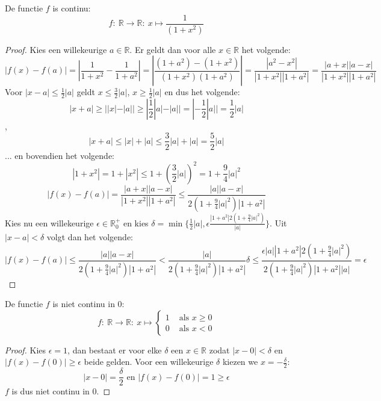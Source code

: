 \documentclass[main.tex]{subfiles}
\begin{document}
\begin{vb}
  De functie $f$ is continu:
  \[ f:\ \mathbb{R} \rightarrow \mathbb{R}:\ x \mapsto \frac{1}{(1+x^{2})} \]

  \begin{proof}
    Kies een willekeurige $a\in \mathbb{R}$.
    Er geldt dan voor alle $x \in \mathbb{R}$ het volgende:
    \[
    |f(x)-f(a)|
    = \left| \frac{1}{1+x^{2}} - \frac{1}{1+a^{2}}\right|
    = \left| \frac{(1+a^{2})-(1+x^{2})}{(1+x^{2})(1+a^{2})}\right|
    = \frac{|a^{2}-x^{2}|}{|1+x^{2}||1+a^{2}|}
    = \frac{|a+x||a-x|}{|1+x^{2}||1+a^{2}|}
    \]
    Voor $|x-a| \le \frac{1}{2}|a|$ geldt $x \le \frac{3}{2}|a|$, $x \ge \frac{1}{2}|a|$ en dus het volgende:
    \[ |x+a| \ge ||x|-|a|| \ge |\frac{1}{2}|a| - |a|| = |-\frac{1}{2}|a|| = \frac{1}{2}|a| \]
    ,
    \[ |x+a| \le |x|+|a| \le \frac{3}{2}|a| + |a| = \frac{5}{2}|a| \]
    ... en bovendien het volgende:
    \[ |1+x^{2}| = 1 + |x^{2}| \le 1 + \left(\frac{3}{2}|a|\right)^{2} = 1 + \frac{9}{4}|a|^{2} \]
    \[
    |f(x)-f(a)|
    = \frac{|a+x||a-x|}{|1+x^{2}||1+a^{2}|}
    \le \frac{|a||a-x|}{2\left(1 + \frac{9}{4}|a|^{2}\right)|1+a^{2}|}
    \]
    Kies nu een willekeurige $\epsilon \in \mathbb{R}_{0}^{+}$ en kies $\delta = \min\{\frac{1}{2}|a|,\epsilon\frac{|1+a^{2}|2\left(1 + \frac{9}{4}|a|^{2}\right)}{|a|} \}$.
    Uit $|x-a| < \delta$ volgt dan het volgende:
    \[ 
    |f(x)-f(a)|
    \le \frac{|a||a-x|}{2\left(1 + \frac{9}{4}|a|^{2}\right)|1+a^{2}|}
    < \frac{|a|}{2\left(1 + \frac{9}{4}|a|^{2}\right)|1+a^{2}|}\delta
    \le \frac{\epsilon|a||1+a^{2}|2\left(1 + \frac{9}{4}|a|^{2}\right)}{2\left(1 + \frac{9}{4}|a|^{2}\right)|1+a^{2}||a|} = \epsilon
    \]
  \end{proof}
\feed
\end{vb}


\begin{tvb}
  De functie $f$ is niet continu in $0$:
  \[
  f:\ \mathbb{R} \rightarrow \mathbb{R}:\ x\mapsto 
  \left\{
    \begin{array}{cl}
      1 & \text{ als } x \ge 0\\
      0 & \text{ als } x < 0
    \end{array}
  \right.
  \]

  \begin{proof}
    Kies $\epsilon = 1$, dan bestaat er voor elke $\delta$ een $x\in \mathbb{R}$ zodat $|x-0|<\delta$ en $|f(x)-f(0)|\ge \epsilon$ beide gelden.
    Voor een willekeurige $\delta$ kiezen we $x = -\frac{\delta}{2}$:
    \[ |x-0| = \frac{\delta}{2} \text{ en } |f(x)-f(0)| = 1 \ge \epsilon \]
    $f$ is dus niet continu in $0$.
  \end{proof}
\end{tvb}
\end{document}
